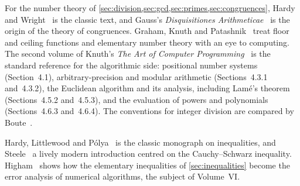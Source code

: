 For the number theory of \cref{sec:division,sec:gcd,sec:primes,sec:congruences}, Hardy and Wright~\cite{hardywright2008} is the classic text, and Gauss's \emph{Disquisitiones Arithmeticae}~\cite{gauss1801} is the origin of the theory of congruences. Graham, Knuth and Patashnik~\cite{graham1994concrete} treat floor and ceiling functions and elementary number theory with an eye to computing. The second volume of Knuth's \emph{The Art of Computer Programming}~\cite{knuth1997taocp2} is the standard reference for the algorithmic side: positional number systems (Section~4.1), arbitrary-precision and modular arithmetic (Sections~4.3.1 and~4.3.2), the Euclidean algorithm and its analysis, including Lam\'e's theorem~\cite{lame1844} (Sections~4.5.2 and~4.5.3), and the evaluation of powers and polynomials (Sections~4.6.3 and~4.6.4). The conventions for integer division are compared by Boute~\cite{boute1992}.

Hardy, Littlewood and P\'olya~\cite{hardy1952inequalities} is the classic monograph on inequalities, and Steele~\cite{steele2004} a lively modern introduction centred on the Cauchy--Schwarz inequality. Higham~\cite{higham2002accuracy} shows how the elementary inequalities of \cref{sec:inequalities} become the error analysis of numerical algorithms, the subject of Volume~VI.

\chapterreferences
